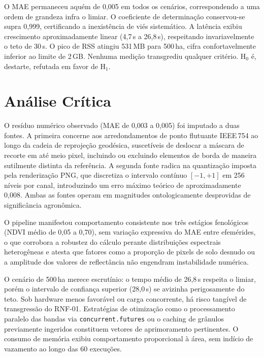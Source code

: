 \documentclass[10pt, a4paper]{article}
\begin{document}
O MAE permaneceu aquém de 0,005 em todos os cenários, correspondendo a uma ordem de grandeza infra o limiar. O coeficiente de determinação conservou-se supra 0,999, certificando a inexistência de viés sistemático. A latência exibiu crescimento aproximadamente linear (4,7\,s a 26,8\,s), respeitando invariavelmente o teto de 30\,s. O pico de RSS atingiu 531\,MB para 500\,ha, cifra confortavelmente inferior ao limite de 2\,GB. Nenhuma medição transgrediu qualquer critério. $\text{H}_0$ é, destarte, refutada em favor de $\text{H}_1$.

\section{Análise Crítica}

O resíduo numérico observado (MAE de 0,003 a 0,005) foi imputado a duas fontes. A primeira concerne aos arredondamentos de ponto flutuante IEEE\,754 ao longo da cadeia de reprojeção geodésica, suscetíveis de deslocar a máscara de recorte em até meio pixel, incluindo ou excluindo elementos de borda de maneira sutilmente distinta da referência. A segunda fonte radica na quantização imposta pela renderização PNG, que discretiza o intervalo contínuo $[-1, +1]$ em 256 níveis por canal, introduzindo um erro máximo teórico de aproximadamente 0,008. Ambas as fontes operam em magnitudes ontologicamente desprovidas de significância agronômica.

O pipeline manifestou comportamento consistente nos três estágios fenológicos (NDVI médio de 0,05 a 0,70), sem variação expressiva do MAE entre efemérides, o que corrobora a robustez do cálculo perante distribuições espectrais heterogêneas e atesta que fatores como a proporção de pixels de solo desnudo ou a amplitude dos valores de reflectância não engendram instabilidade numérica.

O cenário de 500\,ha merece escrutínio: o tempo médio de 26,8\,s respeita o limiar, porém o intervalo de confiança superior (28,0\,s) se avizinha perigosamente do teto. Sob hardware menos favorável ou carga concorrente, há risco tangível de transgressão do RNF-01. Estratégias de otimização como o processamento paralelo das bandas via \texttt{concurrent.futures} ou o caching de grânulos previamente ingeridos constituem vetores de aprimoramento pertinentes. O consumo de memória exibiu comportamento proporcional à área, sem indício de vazamento ao longo das 60 execuções.
\end{document}
